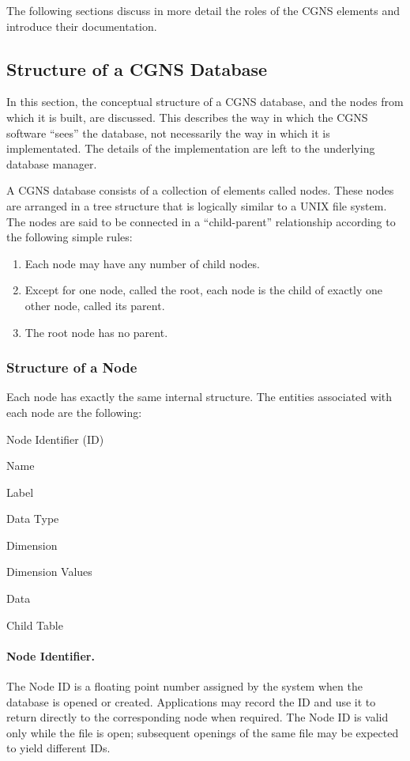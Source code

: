 The following sections discuss in more detail the roles of the CGNS
elements and introduce their documentation.

\subsection{Structure of a CGNS Database}

In this section, the conceptual structure of a CGNS database, and the
nodes from which it is built, are discussed. This describes the way
in which the CGNS software ``sees'' the database, not necessarily the way
in which it is implementated. The details of the implementation are
left to the underlying database manager.

A CGNS database consists of a collection of elements called nodes.
These nodes are arranged in a tree structure that is logically similar
to a UNIX file system.
The nodes are said to be connected in a ``child-parent'' relationship
according to the following simple rules:

\begin{enumerate}
\item Each node may have any number of child nodes.
\item Except for one node, called the root, each node is the child of
      exactly one other node, called its parent.
\item The root node has no parent.
\end{enumerate}

\subsubsection{Structure of a Node}

Each node has exactly the same internal structure.
The entities associated with each node are the following:

\begin{itemize*}
\item Node Identifier (ID)
\item Name
\item Label
\item Data Type
\item Dimension
\item Dimension Values
\item Data
\item Child Table
\end{itemize*}

\paragraph{Node Identifier.}
The Node ID is a floating point number assigned by the system when the
database is opened or created.
Applications may record the ID and use it to return directly to the
corresponding node when required.
The Node ID is valid only while the file is open; subsequent openings of
the same file may be expected to yield different IDs.

